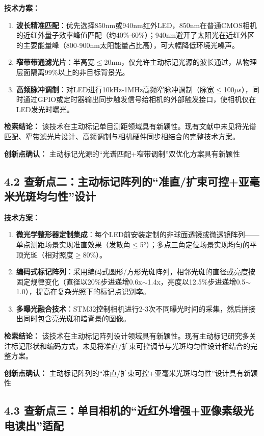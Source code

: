 \documentclass[12pt,a4paper]{article}
\begin{document}
\textbf{技术方案：}

\begin{enumerate}
\item \textbf{波长精准匹配}：优先选择850nm或940nm红外LED，850nm在普通CMOS相机的近红外量子效率峰值匹配（约40\%-60\%）；940nm避开了太阳光在近红外区的主要能量峰（800-900nm太阳能量占比高），可大幅降低环境光噪声。
\item \textbf{窄带带通滤光片}：半高宽$\le$20nm，仅允许主动标记光源的波长通过，从物理层面隔离99\%以上的非目标背景光。
\item \textbf{高频脉冲调制}：对LED进行10kHz-1MHz高频窄脉冲调制（脉宽$\le$100$\mu$s），同时通过GPIO或定时器输出同步触发信号给相机的外部触发接口，使相机仅在LED发光时曝光。
\end{enumerate}

\textbf{检索结论：} 该技术在主动标记单目测距领域具有新颖性。现有文献中未见将光谱匹配、窄带滤光片设计、高频调制与相机硬件同步相结合的完整技术方案。

\textbf{创新点确认：} 主动标记光源的``光谱匹配+窄带调制''双优化方案具有新颖性

\subsection{4.2 查新点二：主动标记阵列的``准直/扩束可控+亚毫米光斑均匀性''设计}

\textbf{技术方案：}

\begin{enumerate}
\item \textbf{微光学整形器定制集成}：每个LED前安装定制的非球面透镜或微透镜阵列——单点测距场景实现准直效果（发散角$\le$5°）；多点三角定位场景实现均匀的平顶光斑（相对照度$\ge$80\%）。
\item \textbf{编码式标记阵列}：采用编码式圆形/方形光斑阵列，相邻光斑的直径或亮度按固定规律变化（直径以20\%步进递增0.6x$\sim$1.4x，亮度以12.5\%步进递增0.5$\sim$1.0），提高在复杂光照下的标记点识别率。
\item \textbf{多曝光融合技术}：STM32控制相机进行2-3次不同曝光时间的采集，然后拼接出同时包含亮光斑和暗背景的图像。
\end{enumerate}

\textbf{检索结论：} 该技术在主动标记阵列设计领域具有新颖性。现有主动标记研究多关注标记形状和编码方式，未见将准直/扩束可控调节与光斑均匀性设计相结合的完整方案。

\textbf{创新点确认：} 主动标记阵列的``准直/扩束可控+亚毫米光斑均匀性''设计具有新颖性

\subsection{4.3 查新点三：单目相机的``近红外增强+亚像素级光电读出''适配}
\end{document}
